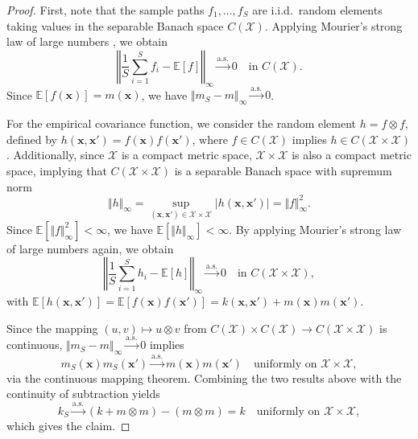 \documentclass{article}
\newcommand{\K}{S}
\newcommand{\domain}{\mathcal{X}}
\newcommand{\vx}{\mathbf{x}}
\newcommand{\iid}{i.i.d.\ }
\begin{document}
\begin{proof}
First, note that the sample paths $f_1, ..., f_\K$ are \iid random elements taking values in the separable Banach space $C(\domain)$.
Applying Mourier's strong law of large numbers \citep{mourier1953}, we obtain
\begin{equation*}
    \left\Vert \frac{1}{\K} \sum_{i=1}^\K f_i - \mathbb{E}[f] \right\Vert_{\infty} \xrightarrow{\mathrm{a.s.}} 0
    \quad \text{in } C(\domain).
\end{equation*}
Since $\mathbb{E}[f(\vx)] = m(\vx)$, we have $\Vert m_\K - m \Vert_{\infty} \xrightarrow{\mathrm{a.s.}} 0$.

For the empirical covariance function, we consider the random element $h = f \otimes f$, defined by $h(\vx, \vx') = f(\vx)f(\vx')$, where $f \in C(\domain)$ implies $h \in C(\domain \times \domain)$.
Additionally, since $\domain$ is a compact metric space, $\domain \times \domain$ is also a compact metric space, implying that $C(\domain \times \domain)$ is a separable Banach space with supremum norm
\begin{equation*}
    \Vert h \Vert_{\infty}
    = \sup_{(\vx, \vx') \in \domain \times \domain} | h(\vx, \vx') |
    = \Vert f \Vert_{\infty}^2.
\end{equation*}
Since $\mathbb{E} [\Vert f \Vert_{\infty}^2] < \infty$, we have $\mathbb{E} [\Vert h \Vert_{\infty}] < \infty$.
By applying Mourier's strong law of large numbers \citep{mourier1953} again, we obtain
\begin{equation*}
    \left\Vert \frac{1}{\K} \sum_{i=1}^\K h_i - \mathbb{E}[h] \right\Vert_{\infty} \xrightarrow{\mathrm{a.s.}} 0
    \quad \text{in } C(\domain \times \domain),
\end{equation*}
with $\mathbb{E}[h(\vx, \vx')] = \mathbb{E}[f(\vx)f(\vx')] = k(\vx, \vx') + m(\vx) m(\vx')$.

Since the mapping $(u, v) \mapsto u \otimes v$ from $C(\domain) \times C(\domain) \to C(\domain \times \domain)$ is continuous, $\Vert m_\K - m \Vert_{\infty} \xrightarrow{\mathrm{a.s.}} 0$ implies
\begin{equation*}
    m_\K(\vx) m_\K(\vx') \xrightarrow{\mathrm{a.s.}} m(\vx) m(\vx')
    \quad \text{uniformly on } \domain \times \domain,
\end{equation*}
via the continuous mapping theorem.
Combining the two results above with the continuity of subtraction yields
\begin{equation*}
    k_\K \xrightarrow{\mathrm{a.s.}} (k + m \otimes m) - (m \otimes m) = k \quad \text{uniformly on } \domain \times \domain,
\end{equation*}
which gives the claim.
\end{proof}
\end{document}
